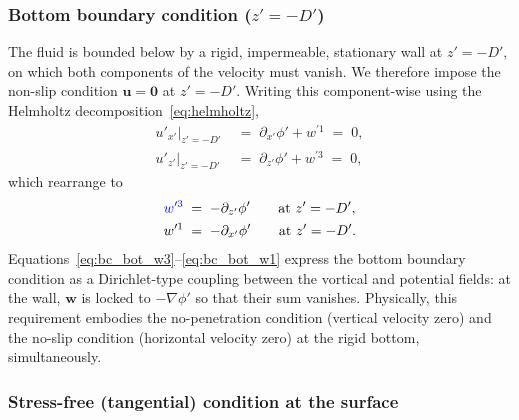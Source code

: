 \documentclass{article}
\newcommand{\uu}{\mathbf{u}}
\newcommand{\ww}{\mathbf{w}}
\begin{document}
\subsubsection{Bottom boundary condition (\texorpdfstring{$z' = -D'$}{z' = -D'})}
\label{sec:bc_bottom}

The fluid is bounded below by a rigid, impermeable, stationary wall at $z' = -D'$, on which both components of the velocity must vanish.
We therefore impose the non-slip condition $\uu = \bm{0}$ at $z' = -D'$.
Writing this component-wise using the Helmholtz decomposition~\eqref{eq:helmholtz},
\begin{align}
    u'_{x'}\big|_{z'=-D'} \;&=\; \partial_{x'}\phi' + w^{\prime 1} \;=\; 0, \label{eq:bot_x_velocity} \\
    u'_{z'}\big|_{z'=-D'} \;&=\; \partial_{z'}\phi' + w^{\prime 3} \;=\; 0, \label{eq:bot_z_velocity}
\end{align}
which rearrange to
\color{black}
\begin{align}
\color{blue}
    w^{\prime 3} \;&=\; -\partial_{z'}\phi' \qquad \text{at } z' = -D', \label{eq:bc_bot_w3} \\
    w^{\prime 1} \;&=\; -\partial_{x'}\phi' \qquad \text{at } z' = -D'. \label{eq:bc_bot_w1}
\end{align}
Equations~\eqref{eq:bc_bot_w3}--\eqref{eq:bc_bot_w1} express the bottom boundary condition as a Dirichlet-type coupling between the vortical and potential fields: at the wall, $\ww$ is locked to $-\nabla\phi'$ so that their sum vanishes.
Physically, this requirement embodies the no-penetration condition (vertical velocity zero) and the no-slip condition (horizontal velocity zero) at the rigid bottom, simultaneously.

\subsubsection{Stress-free (tangential) condition at the surface}
\label{sec:stress_free_w1}
\end{document}
